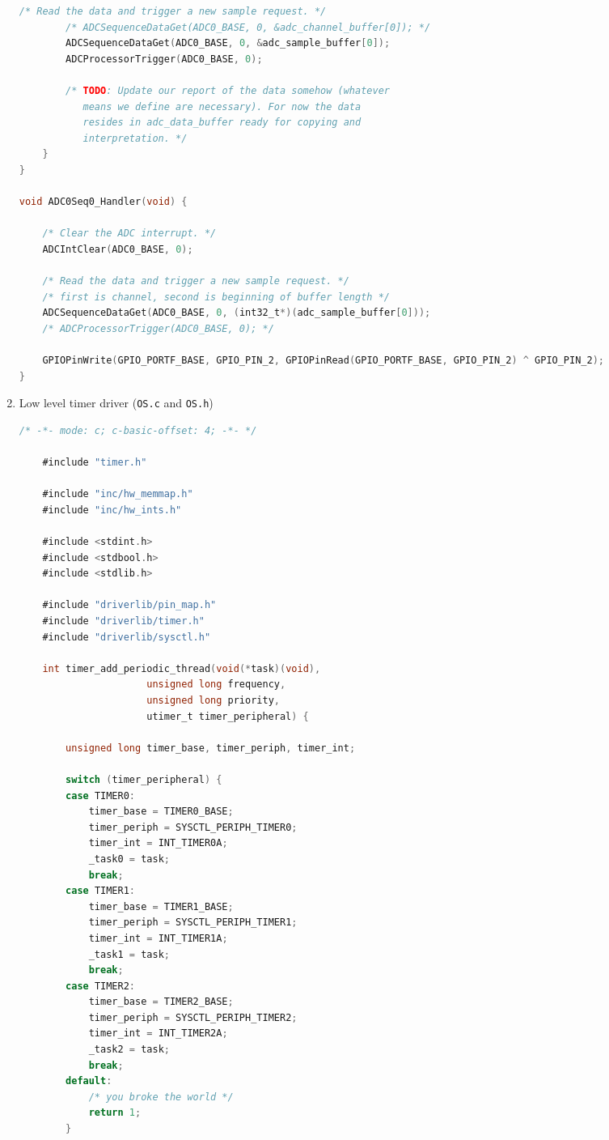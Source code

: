 \documentclass[12pt]{article}
\begin{document}
\begin{enumerate}[1)]
\begin{lstlisting}[language=C]
        /* Read the data and trigger a new sample request. */
        /* ADCSequenceDataGet(ADC0_BASE, 0, &adc_channel_buffer[0]); */
        ADCSequenceDataGet(ADC0_BASE, 0, &adc_sample_buffer[0]);
        ADCProcessorTrigger(ADC0_BASE, 0);

        /* TODO: Update our report of the data somehow (whatever
           means we define are necessary). For now the data
           resides in adc_data_buffer ready for copying and
           interpretation. */
    }
}

void ADC0Seq0_Handler(void) {

    /* Clear the ADC interrupt. */
    ADCIntClear(ADC0_BASE, 0);

    /* Read the data and trigger a new sample request. */
    /* first is channel, second is beginning of buffer length */
    ADCSequenceDataGet(ADC0_BASE, 0, (int32_t*)(adc_sample_buffer[0]));
    /* ADCProcessorTrigger(ADC0_BASE, 0); */

    GPIOPinWrite(GPIO_PORTF_BASE, GPIO_PIN_2, GPIOPinRead(GPIO_PORTF_BASE, GPIO_PIN_2) ^ GPIO_PIN_2);
}
  \end{lstlisting}
\item Low level timer driver (\verb|OS.c| and \verb|OS.h|) \\
  \begin{lstlisting}[language=C]
    /* -*- mode: c; c-basic-offset: 4; -*- */

    #include "timer.h"

    #include "inc/hw_memmap.h"
    #include "inc/hw_ints.h"

    #include <stdint.h>
    #include <stdbool.h>
    #include <stdlib.h>

    #include "driverlib/pin_map.h"
    #include "driverlib/timer.h"
    #include "driverlib/sysctl.h"

    int timer_add_periodic_thread(void(*task)(void),
    			      unsigned long frequency,
    			      unsigned long priority,
    			      utimer_t timer_peripheral) {

        unsigned long timer_base, timer_periph, timer_int;

        switch (timer_peripheral) {
        case TIMER0:
            timer_base = TIMER0_BASE;
            timer_periph = SYSCTL_PERIPH_TIMER0;
            timer_int = INT_TIMER0A;
            _task0 = task;
            break;
        case TIMER1:
            timer_base = TIMER1_BASE;
            timer_periph = SYSCTL_PERIPH_TIMER1;
            timer_int = INT_TIMER1A;
            _task1 = task;
            break;
        case TIMER2:
            timer_base = TIMER2_BASE;
            timer_periph = SYSCTL_PERIPH_TIMER2;
            timer_int = INT_TIMER2A;
            _task2 = task;
            break;
        default:
            /* you broke the world */
            return 1;
        }


\end{lstlisting}
\end{enumerate}
\end{document}
